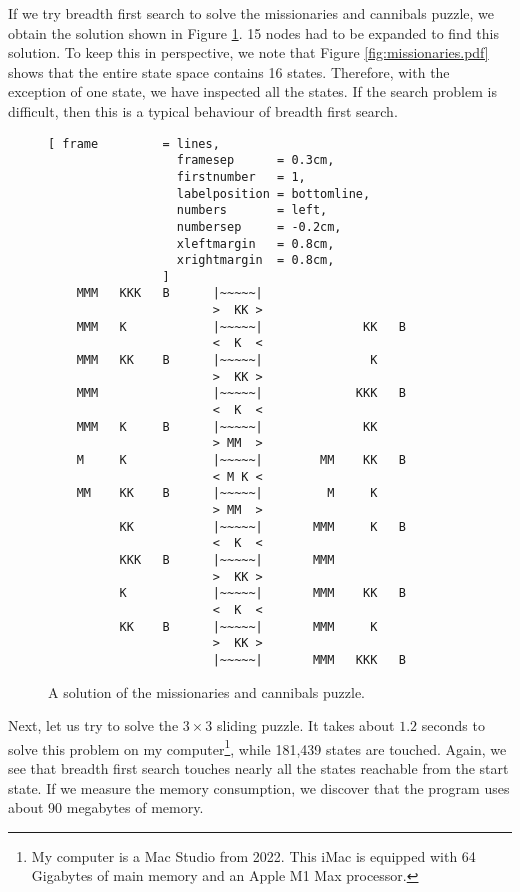 If we try breadth first search to solve the missionaries and cannibals puzzle, we obtain
the solution shown in Figure \ref{fig:missionaries.solution}.  15 nodes had to be expanded to find
this solution.  To keep this in perspective, we note that Figure \ref{fig:missionaries.pdf} shows
that the entire state space contains 16 states.  Therefore, with the exception of one state, we have
inspected all the states.  If the search problem is difficult, then this is a typical behaviour of breadth
first search. 

\begin{figure}[!ht]
\centering
\begin{Verbatim}[ frame         = lines,
                  framesep      = 0.3cm,
                  firstnumber   = 1,
                  labelposition = bottomline,
                  numbers       = left,
                  numbersep     = -0.2cm,
                  xleftmargin   = 0.8cm,
                  xrightmargin  = 0.8cm,
                ]
    MMM   KKK   B      |~~~~~|
                       >  KK >
    MMM   K            |~~~~~|              KK   B
                       <  K  <
    MMM   KK    B      |~~~~~|               K
                       >  KK >
    MMM                |~~~~~|             KKK   B
                       <  K  <
    MMM   K     B      |~~~~~|              KK
                       > MM  >
    M     K            |~~~~~|        MM    KK   B
                       < M K <
    MM    KK    B      |~~~~~|         M     K
                       > MM  >
          KK           |~~~~~|       MMM     K   B
                       <  K  <
          KKK   B      |~~~~~|       MMM
                       >  KK >
          K            |~~~~~|       MMM    KK   B
                       <  K  <
          KK    B      |~~~~~|       MMM     K
                       >  KK >
                       |~~~~~|       MMM   KKK   B
\end{Verbatim}
\vspace*{-0.3cm}
\caption{A solution of the missionaries and cannibals puzzle.}
\label{fig:missionaries.solution}
\end{figure}

Next, let us try to solve the $3 \times 3$ sliding puzzle.  It takes about $1.2$ seconds to solve
this problem on my computer\footnote{
  My computer is a Mac Studio from 2022.  This iMac is equipped with 64 Gigabytes of main memory and an
  Apple M1 Max processor.
}, while 181,439 states are touched.  
Again, we see that breadth first search touches nearly all the states reachable from the start state.
If we measure the memory consumption, we discover that the program uses about 90 megabytes of memory.

